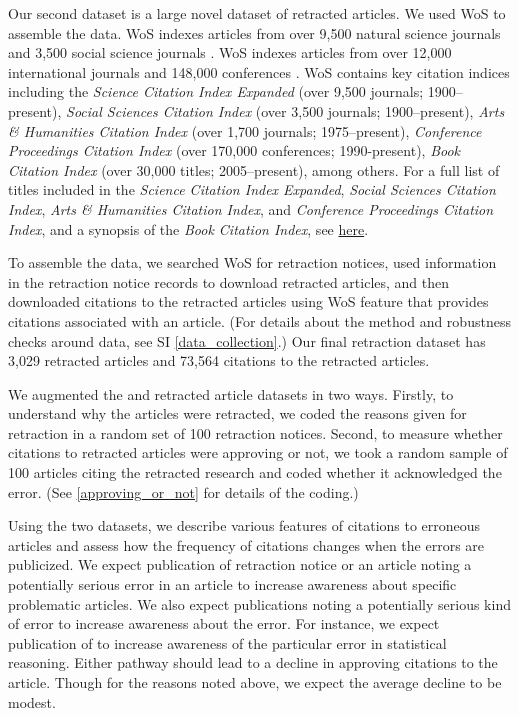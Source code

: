 \documentclass[12pt, letterpaper]{article}
\begin{document}
Our second dataset is a large novel dataset of retracted articles. We used WoS to assemble the data. WoS indexes articles from over 9,500 natural science journals and 3,500 social science journals \citep{yong2013web}. WoS indexes articles from over 12,000 international journals and 148,000 conferences \citep{yong2013web}. WoS contains key citation indices including the \textit{Science Citation Index Expanded} (over 9,500 journals; 1900--present), \textit{Social Sciences Citation Index} (over 3,500 journals; 1900--present), \textit{Arts \& Humanities Citation Index} (over 1,700 journals; 1975--present), \textit{Conference Proceedings Citation Index} (over 170,000 conferences; 1990-present), \textit{Book Citation Index} (over 30,000 titles; 2005--present), among others. For a full list of titles included in the \textit{Science Citation Index Expanded}, \textit{Social Sciences Citation Index}, \textit{Arts \& Humanities Citation Index}, and \textit{Conference Proceedings Citation Index}, and a synopsis of the \textit{Book Citation Index}, see \href{https://github.com/recite/propagation\_of\_error/tree/master/data/11\_wos/what\_is\_in\_wos/}{here}.

To assemble the data, we searched WoS for retraction notices, used information in the retraction notice records to download retracted articles, and then downloaded citations to the retracted articles using WoS feature that provides citations associated with an article. (For details about the method and robustness checks around data, see SI \ref{data_collection}.) Our final retraction dataset has 3,029 retracted articles and 73,564 citations to the retracted articles.

We augmented the \citeauthor{nieuwenhuis2011} and retracted article datasets in two ways. Firstly, to understand why the articles were retracted, we coded the reasons given for retraction in a random set of 100 retraction notices. Second, to measure whether citations to retracted articles were approving or not, we took a random sample of 100 articles citing the retracted research and coded whether it acknowledged the error. (See \ref{approving_or_not} for details of the coding.)

Using the two datasets, we describe various features of citations to erroneous articles and assess how the frequency of citations changes when the errors are publicized. We expect publication of retraction notice or an article noting a potentially serious error in an article to increase awareness about specific problematic articles. We also expect publications noting a potentially serious kind of error to increase awareness about the error. For instance, we expect publication of \citet{nieuwenhuis2011} to increase awareness of the particular error in statistical reasoning. Either pathway should lead to a decline in approving citations to the article. Though for the reasons noted above, we expect the average decline to be modest.
\end{document}
